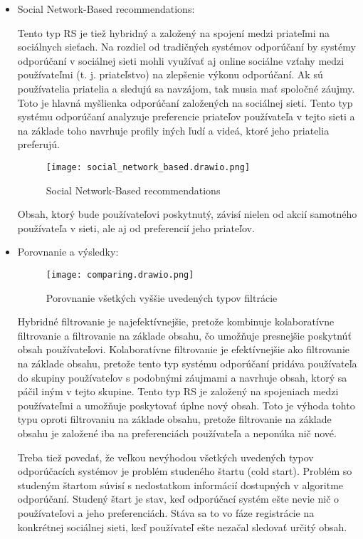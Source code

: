 \documentclass[10pt,twoside,slovak,a4paper]{article}
\begin{document}
\begin{itemize}
\item Social Network-Based recommendations:

Tento typ RS je tiež hybridný a založený na spojení medzi priateľmi na sociálnych sieťach. Na rozdiel od tradičných systémov odporúčaní by systémy odporúčaní v sociálnej sieti mohli využívať aj online sociálne vzťahy medzi používateľmi (t. j. priateľstvo) na zlepšenie výkonu odporúčaní\cite{li_social_network08}. Ak sú používatelia priatelia a sledujú sa navzájom, tak musia mať spoločné záujmy. Toto je hlavná myšlienka odporúčaní založených na sociálnej sieti. Tento typ systému odporúčaní analyzuje preferencie priateľov používateľa v tejto sieti a na základe toho navrhuje profily iných ľudí a videá, ktoré jeho priatelia preferujú.

\begin{figure}[h]
    \centering
    \texttt{[image: social\_network\_based.drawio.png]}
    \caption{Social Network-Based recommendations}
    \label{fig:network-based}
\end{figure}

Obsah, ktorý bude používateľovi poskytnutý, závisí nielen od akcií samotného používateľa v sieti, ale aj od preferencií jeho priateľov.


\item Porovnanie a výsledky:

\begin{figure}[h]
    \centering
    \texttt{[image: comparing.drawio.png]}
    \caption{Porovnanie všetkých vyššie uvedených typov filtrácie}
    \label{fig:comparing}
\end{figure}

Hybridné filtrovanie je najefektívnejšie, pretože kombinuje kolaboratívne filtrovanie a filtrovanie na základe obsahu, čo umožňuje presnejšie poskytnúť obsah používateľovi. Kolaboratívne filtrovanie je efektívnejšie ako filtrovanie  na základe obsahu, pretože tento typ systému odporúčaní pridáva používateľa do skupiny používateľov s podobnými záujmami a navrhuje obsah, ktorý sa páčil iným v tejto skupine. Tento typ RS je založený na spojeniach medzi používateľmi a umožňuje poskytovať úplne nový obsah. Toto je výhoda tohto typu oproti filtrovaniu na základe obsahu, pretože filtrovanie na základe obsahu je založené iba na preferenciách používateľa a neponúka nič nové.

Treba tiež povedať, že veľkou nevýhodou všetkých uvedených typov odporúčacích systémov je problém studeného štartu (cold start). Problém so studeným štartom súvisí s nedostatkom informácií dostupných v algoritme odporúčaní\cite{lika_cold_strart10}. Studený štart je stav, keď odporúčací systém ešte nevie nič o používateľovi a jeho preferenciách. Stáva sa to vo fáze registrácie na konkrétnej sociálnej sieti, keď používateľ ešte nezačal sledovať určitý obsah.


\end{itemize}
\end{document}
